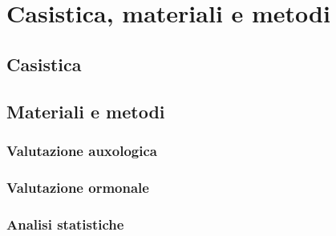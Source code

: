 \chapter{Casistica, materiali e metodi}

\section{Casistica}

\section{Materiali e metodi}

\subsection{Valutazione auxologica}

\subsection{Valutazione ormonale}

\subsection{Analisi statistiche}
